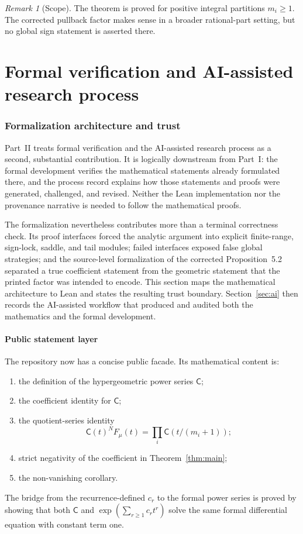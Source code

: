 \documentclass[11pt]{article}
\theoremstyle{definition}
\theoremstyle{remark}
\newtheorem{remark}[theorem]{Remark}
\newcommand{\C}{\mathsf C}
\begin{document}
\begin{remark}[Scope]
The theorem is proved for positive integral partitions $m_i\ge1$.  The
corrected pullback factor makes sense in a broader rational-part setting, but
no global sign statement is asserted there.
\end{remark}

\part{Formal verification and AI-assisted research process}\label{part:formal-ai}

\section{Formalization architecture and trust}\label{sec:formalization}

Part~II treats formal verification and the AI-assisted research process as a
second, substantial contribution.  It is logically downstream from Part~I: the
formal development verifies the mathematical statements already formulated
there, and the process record explains how those statements and proofs were
generated, challenged, and revised.  Neither the Lean implementation nor the
provenance narrative is needed to follow the mathematical proofs.

The formalization nevertheless contributes more than a terminal correctness
check.  Its proof interfaces forced the analytic argument into explicit
finite-range, sign-lock, saddle, and tail modules; failed interfaces exposed
false global strategies; and the source-level formalization of the corrected
Proposition~5.2 separated a true coefficient statement from the geometric
statement that the printed factor was intended to encode.  This section maps
the mathematical architecture to Lean and states the resulting trust boundary.
Section~\ref{sec:ai} then records the AI-assisted workflow that produced and
audited both the mathematics and the formal development.

\subsection{Public statement layer}

The repository now has a concise public facade.  Its mathematical content is:
\begin{enumerate}[leftmargin=2em]
  \item the definition of the hypergeometric power series $\C$;
  \item the coefficient identity for $\C$;
  \item the quotient-series identity
  \[
    \C(t)^N F_\mu(t)=\prod_i\C(t/(m_i+1));
  \]
  \item strict negativity of the coefficient in Theorem~\ref{thm:main};
  \item the non-vanishing corollary.
\end{enumerate}
The bridge from the recurrence-defined $c_r$ to the formal power series is
proved by showing that both $\C$ and
$\exp(\sum_{r\ge1}c_rt^r)$ solve the same formal differential equation with
constant term one.
\end{document}
